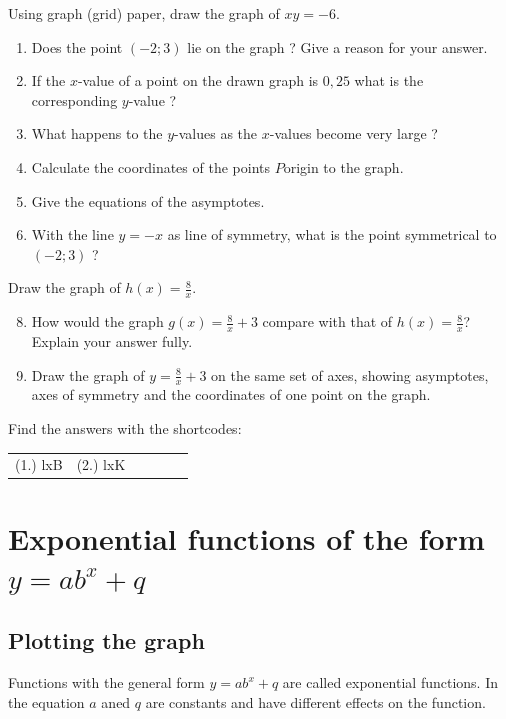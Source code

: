 \begin{exercises}{}
{
Using graph (grid) paper, draw the graph of $xy=-6$.
    \begin{enumerate}[noitemsep, label=\textbf{\arabic*}. ] 
    \item Does the point $(-2; 3)$ lie on the graph ? Give a reason for your answer.

    \item If the $x$-value of a point on the drawn graph is $0,25$ what is the corresponding $y$-value ?
    \item What happens to the $y$-values as the $x$-values become very large ?
\item Calculate the coordinates of the points $P$origin to the graph.
\item Give the equations of the asymptotes.
    \item With the line $y=-x$ as line of symmetry, what is the point symmetrical to $(-2; 3)$ ?
    \end{enumerate}
Draw the graph of $h(x)=\frac{8}{x}$.
    \begin{enumerate}[noitemsep, label=\textbf{\arabic*}. ] 
\setcounter{enumi}{7}
    \item How would the graph $g(x)=\frac{8}{x}+3$ compare with that of $h(x)=\frac{8}{x}$? Explain your answer fully.
    \item Draw the graph of $y=\frac{8}{x}+3$ on the same set of axes, showing asymptotes, axes of symmetry and the coordinates of one point on the graph.
    \end{enumerate}


\par {} Find the answers with the shortcodes:
\par \begin{tabular}[h]{cccccc}
(1.) lxB  &  (2.) lxK  & \end{tabular}
}
\end{exercises}

\section{Exponential functions of the form $y=ab^{x}+q$}

\subsection*{Plotting the graph}         
Functions with the general form $y=ab^{x}+q$ are called exponential functions. In the equation $a$ aned $q$ are constants and have different effects on the function.

